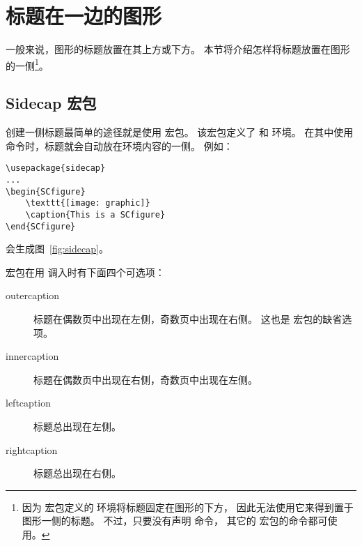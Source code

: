 \begin{figure}
	\centering
	\begin{minipage}[c]{1in}
		\hfill
	\end{minipage}%
	\hspace{0.2in}%
	\begin{minipage}[c]{0.5in}
		\captionsetup{width=2in}
		\label{fig:rotcaption}
	\end{minipage}
\end{figure}


\section{标题在一边的图形}\label{sec:sidecaption}

一般来说，图形的标题放置在其上方或下方。
本节将介绍怎样将标题放置在图形的一侧\footnote{
	因为  宏包定义的  环境将标题固定在图形的下方，
	因此无法使用它来得到置于图形一侧的标题。
	不过，只要没有声明  命令，
	其它的  宏包的命令都可使用。}。


\subsection{Sidecap 宏包}\label{ssec:sidecap}

创建一侧标题最简单的途径就是使用  宏包。
该宏包定义了  和  环境。
在其中使用  命令时，标题就会自动放在环境内容的一侧。
例如：
\begin{lstlisting}
\usepackage{sidecap}
...
\begin{SCfigure}
	\texttt{[image: graphic]}
	\caption{This is a SCfigure}
\end{SCfigure}
\end{lstlisting}
会生成图~\ref{fig:sidecap}。

\begin{SCfigure} 
	\resizebox{3in}{!}{\usebox{\boxgraphic}}
	\caption{This is a SCfigure}
	\label{fig:sidecap}
\end{SCfigure}

 宏包在用  调入时有下面四个可选项：
\begin{description}
	\item [outercaption] 标题在偶数页中出现在左侧，奇数页中出现在右侧。
	这也是  宏包的缺省选项。
	\item [innercaption] 标题在偶数页中出现在右侧，奇数页中出现在左侧。
	\item [leftcaption]  标题总出现在左侧。
	\item [rightcaption] 标题总出现在右侧。
\end{description}

